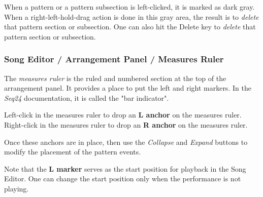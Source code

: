    When a pattern or a pattern subsection is left-clicked, it is marked as
   dark gray.
   When a right-left-hold-drag action is done in this gray area, the result
   is to \textsl{delete} that pattern section or subsection.
   One can also hit the Delete key to \textsl{delete} that pattern section
   or subsection.

\subsubsection{Song Editor / Arrangement Panel / Measures Ruler}
\label{subsubsec:seq24_song_editor_arrangement_panel_measures_ruler}

   The \textsl{measures ruler} is the ruled and numbered section at the top
   of the arrangement panel.  It provides a place to put the left and right
   markers.  In the \textsl{Seq24} documentation, it is called the "bar
   indicator".

   Left-click in the measures ruler to drop an
   \textbf{L anchor} on the measures ruler.
   Right-click in the measures ruler to drop an
   \textbf{R anchor} on the measures ruler.

   Once these anchors are in place, then use
	the \textsl{Collapse} and \textsl{Expand} buttons to modify the
   placement of the pattern events.

   Note that the \textbf{L marker} serves as the start position for playback
   in the Song Editor.  One can change the start position only when the
   performance is not playing.

